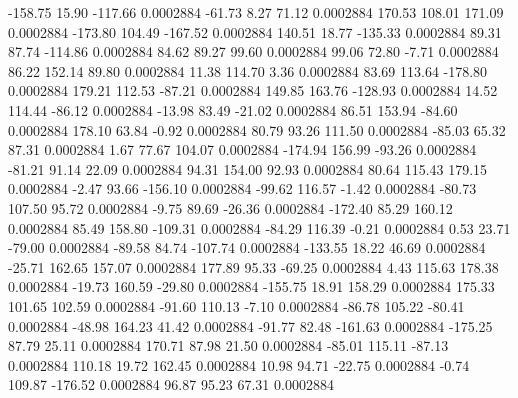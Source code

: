      -158.75       15.90     -117.66     0.0002884
      -61.73        8.27       71.12     0.0002884
      170.53      108.01      171.09     0.0002884
     -173.80      104.49     -167.52     0.0002884
      140.51       18.77     -135.33     0.0002884
       89.31       87.74     -114.86     0.0002884
       84.62       89.27       99.60     0.0002884
       99.06       72.80       -7.71     0.0002884
       86.22      152.14       89.80     0.0002884
       11.38      114.70        3.36     0.0002884
       83.69      113.64     -178.80     0.0002884
      179.21      112.53      -87.21     0.0002884
      149.85      163.76     -128.93     0.0002884
       14.52      114.44      -86.12     0.0002884
      -13.98       83.49      -21.02     0.0002884
       86.51      153.94      -84.60     0.0002884
      178.10       63.84       -0.92     0.0002884
       80.79       93.26      111.50     0.0002884
      -85.03       65.32       87.31     0.0002884
        1.67       77.67      104.07     0.0002884
     -174.94      156.99      -93.26     0.0002884
      -81.21       91.14       22.09     0.0002884
       94.31      154.00       92.93     0.0002884
       80.64      115.43      179.15     0.0002884
       -2.47       93.66     -156.10     0.0002884
      -99.62      116.57       -1.42     0.0002884
      -80.73      107.50       95.72     0.0002884
       -9.75       89.69      -26.36     0.0002884
     -172.40       85.29      160.12     0.0002884
       85.49      158.80     -109.31     0.0002884
      -84.29      116.39       -0.21     0.0002884
        0.53       23.71      -79.00     0.0002884
      -89.58       84.74     -107.74     0.0002884
     -133.55       18.22       46.69     0.0002884
      -25.71      162.65      157.07     0.0002884
      177.89       95.33      -69.25     0.0002884
        4.43      115.63      178.38     0.0002884
      -19.73      160.59      -29.80     0.0002884
     -155.75       18.91      158.29     0.0002884
      175.33      101.65      102.59     0.0002884
      -91.60      110.13       -7.10     0.0002884
      -86.78      105.22      -80.41     0.0002884
      -48.98      164.23       41.42     0.0002884
      -91.77       82.48     -161.63     0.0002884
     -175.25       87.79       25.11     0.0002884
      170.71       87.98       21.50     0.0002884
      -85.01      115.11      -87.13     0.0002884
      110.18       19.72      162.45     0.0002884
       10.98       94.71      -22.75     0.0002884
       -0.74      109.87     -176.52     0.0002884
       96.87       95.23       67.31     0.0002884
